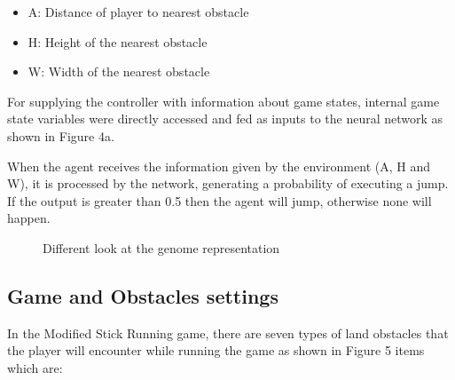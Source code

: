 \documentclass[journal]{IEEEtran}
\begin{document}
\begin{itemize}
\item A: Distance of player to nearest obstacle
\item H: Height of the nearest obstacle
\item W: Width of the nearest obstacle
\end{itemize}

For supplying the controller with information about game states, internal game state variables were
directly accessed and fed as inputs to the neural network as shown in Figure 4a.

When the agent receives the information given by the
environment (A, H and W), it is processed by the network,
generating a probability of executing a jump. If the output is greater than 0.5 then the agent will jump, otherwise none will happen.

\begin{figure}[htbp]
    \begin{center}

    \end{center}
\caption{Different look at the genome representation}    
\end{figure}

\subsection{Game and Obstacles settings}

In the Modified Stick Running game, there are seven types of land obstacles that the player will encounter while running the game as shown in Figure 5 items which are:
\end{document}

